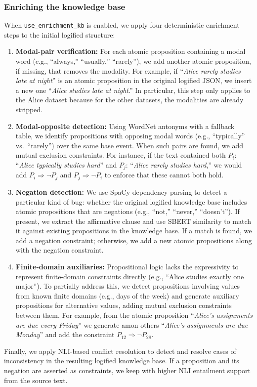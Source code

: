 \documentclass{article} %
\begin{document}
\subsubsection{Enriching the knowledge base}
When \texttt{use\_enrichment\_kb} is enabled, we apply four deterministic enrichment steps to the initial logified structure:
\begin{enumerate}
     \item \textbf{Modal-pair verification:} For each atomic proposition containing a modal word (e.g., ``always,'' ``usually,'' ``rarely''), we add another atomic proposition, if missing, that removes the modality. For example, if  ``\textit{Alice rarely studies late at night}''  is an atomic proposition in the original logified JSON, we insert a new one ``\textit{Alice studies late at night}.'' In particular, this step only applies to the Alice dataset because for the other datasets, the modalities are already stripped. 
     
     
    \item \textbf{Modal-opposite detection:} Using WordNet antonyms with a fallback table, we identify propositions with opposing modal words (e.g., ``typically'' vs.\ ``rarely'') over the same base event. When such pairs are found, we add mutual exclusion constraints. For instance, if the text contained both $P_i$: ``\textit{Alice typically studies hard}'' and $P_j$: ``\textit{Alice rarely studies hard},'' we would add $P_i \Rightarrow \neg P_j$ and $P_j \Rightarrow \neg P_i$ to enforce that these cannot both hold.

    \item \textbf{Negation detection:} We use SpaCy dependency parsing to detect a particular kind of bug: whether the original logified knowledge base includes atomic propositions that are negations (e.g., ``not,'' ``never,'' ``doesn't''). If present,  we extract the affirmative clause and use SBERT similarity to match it against existing propositions in the knowledge base. If a match is found, we add a negation constraint; otherwise, we add a new atomic propositions along with the negation constraint.
    
    \item \textbf{Finite-domain auxiliaries:} Propositional logic lacks the expressivity to represent finite-domain constraints directly (e.g., ``Alice studies exactly one major''). To partially address this, we detect propositions involving values from known finite domains (e.g., days of the week) and generate auxiliary propositions for alternative values, adding mutual exclusion constraints between them. For example, from the atomic proposition ``\textit{Alice's assignments are due every Friday}'' we generate amon others ``\textit{Alice's assignments are due Monday}'' and add the constraint $P_{12} \Rightarrow \neg P_{28}$.

\end{enumerate}
Finally, we apply NLI-based conflict resolution to detect and resolve cases of inconsistency in the resulting logified knowledge base. If a proposition and its negation are asserted as constraints, we keep with higher NLI entailment support from the source text.
\end{document}
